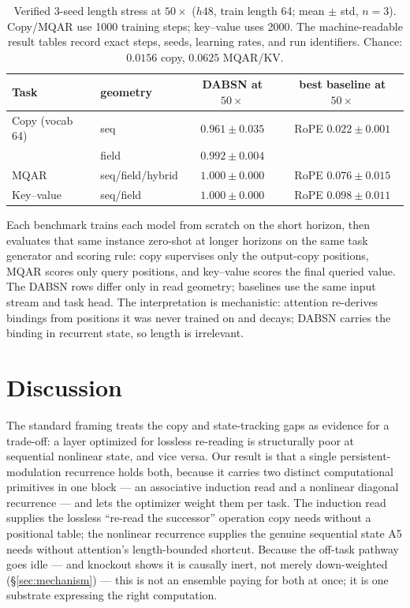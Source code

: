 \documentclass[11pt]{article}
\newcommand{\model}{DABSN}
\begin{document}
\begin{table}[h]
\centering
\caption{Verified 3-seed length stress at $50\times$ ($h48$, train length 64;
mean $\pm$ std, $n{=}3$). Copy/MQAR use 1000 training steps; key--value uses
2000. The machine-readable result tables record exact steps, seeds, learning
rates, and run identifiers. Chance: $0.0156$ copy, $0.0625$ MQAR/KV.}
\label{tab:verified}
\small
\begin{tabular}{llcc}
\toprule
Task & geometry & \model{} at $50\times$ & best baseline at $50\times$ \\
\midrule
Copy (vocab 64) & seq & $0.961 \pm 0.035$ & RoPE $0.022 \pm 0.001$ \\
 & field & $0.992 \pm 0.004$ & \\
MQAR & seq/field/hybrid & $1.000 \pm 0.000$ & RoPE $0.076 \pm 0.015$ \\
Key--value & seq/field & $1.000 \pm 0.000$ & RoPE $0.098 \pm 0.011$ \\
\bottomrule
\end{tabular}
\end{table}

Each benchmark trains each model from scratch on the short horizon, then
evaluates that same instance zero-shot at longer horizons on the same task
generator and scoring rule: copy supervises only the output-copy positions,
MQAR scores only query positions, and key--value scores the final queried
value. The \model{} rows differ only in read geometry; baselines use the same
input stream and task head. The interpretation is mechanistic: attention
re-derives bindings from positions it was never trained on and decays;
\model{} carries the binding in recurrent state, so length is irrelevant.

\section{Discussion}

The standard framing treats the copy and state-tracking gaps as evidence for a
trade-off: a layer optimized for lossless re-reading is structurally poor at
sequential nonlinear state, and vice versa. Our result is that a single
persistent-modulation recurrence holds both, because it carries two distinct
computational primitives in one block --- an associative induction read and a
nonlinear diagonal recurrence --- and lets the optimizer weight them per
task. The induction read supplies the lossless ``re-read the successor''
operation copy needs without a positional table; the nonlinear recurrence
supplies the genuine sequential state A5 needs without attention's
length-bounded shortcut. Because the off-task pathway goes idle --- and
knockout shows it is causally inert, not merely down-weighted
(\S\ref{sec:mechanism}) --- this is not an ensemble paying for both at once; it
is one substrate expressing the right computation.
\end{document}
